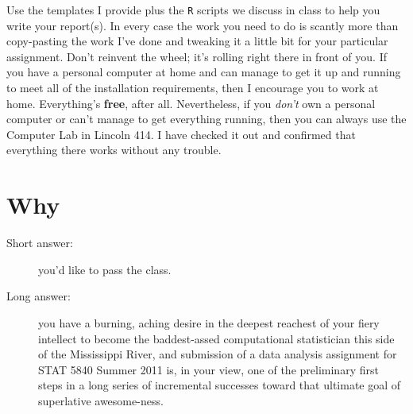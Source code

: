 \documentclass[10pt,english]{article}
\begin{document}
Use the templates I provide plus the \texttt{R} scripts we discuss in class to help you write your report(s).  In every case the work you need to do is scantly more than copy-pasting the work I've done and tweaking it a little bit for your particular assignment.  Don't reinvent the wheel;  it's rolling right there in front of you.  If you have a personal computer at home and can manage to get it up and running to meet all of the installation requirements, then I encourage you to work at home.  Everything's \textbf{free}, after all.  Nevertheless, if you \emph{don't} own a personal computer or can't manage to get everything running, then you can always use the Computer Lab in Lincoln 414.  I have checked it out and confirmed that everything there works without any trouble. 
\section*{Why}
\label{sec-6}


\begin{description}
\item[Short answer:] you'd like to pass the class.
\item[Long answer:] you have a burning, aching desire in the deepest reachest of your fiery intellect to become the baddest-assed computational statistician this side of the Mississippi River, and submission of a data analysis assignment for STAT 5840 Summer 2011 is, in your view, one of the preliminary first steps in a long series of incremental successes toward that ultimate goal of superlative awesome-ness.
\end{description}
\end{document}
